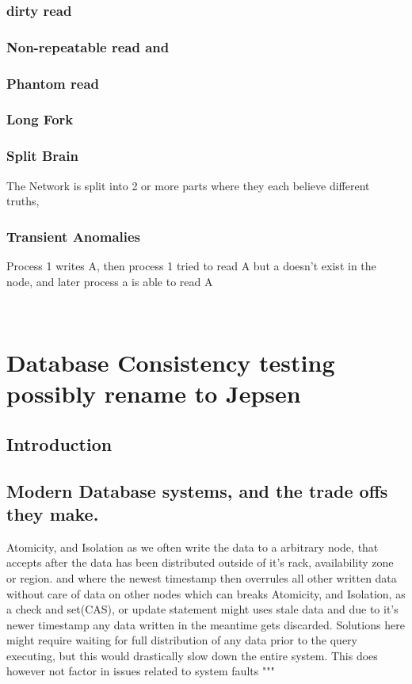 \documentclass[a4paper,10pt,titlepage]{report}
\begin{document}
\subsection{dirty read}
\subsection{Non-repeatable read and}
\subsection{Phantom read}

\subsection{Long Fork}

\subsection{Split Brain}

The Network is split into 2 or more parts where they each believe different truths,


\subsection{Transient Anomalies}

Process 1 writes A, then process 1 tried to read A but a doesn't exist in the node, and later process a is able to read A

\


\chapter{Database Consistency testing possibly rename to Jepsen}



\section{Introduction}


\section{Modern Database systems, and the trade offs they make.}


Atomicity, and Isolation as we often write the data to a arbitrary node, that accepts after the data has been distributed outside of it's rack, availability zone or region. and where the newest timestamp then overrules all other written data without care of data on other nodes which can breaks Atomicity, and Isolation, as a check and set(CAS), or update statement might uses stale data and due to it's newer timestamp any data written in the meantime gets discarded. Solutions here might require waiting for full distribution of any data prior to the query executing, but this would drastically slow down the entire system. This does however not factor in issues related to system faults
"""
\end{document}
